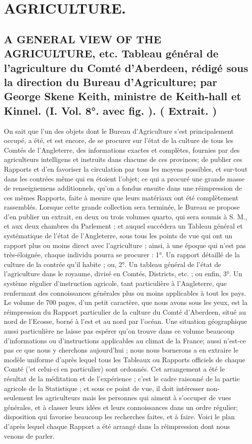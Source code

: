 \setcounter{page}{337}
\chapter{AGRICULTURE.}
\section{A GENERAL VIEW OF THE AGRICULTURE, etc. Tableau général de l'agriculture du Comté d'Aberdeen, rédigé sous la direction du Bureau d'Agriculture; par George Skene Keith, ministre de Keith-hall et Kinnel. (I. Vol. 8°. avec fig. ). \large{( Extrait. )}}
On sait que l'un des objets dont le Bureau d'Agriculture s'est principalement occupé, a été, et est encore, de se procurer sur l'état de la culture de tous les Comtés de l'Angleterre, des informations exactes et complètes, fournies par des agriculteurs intelligens et instruits dans chacune de ces provinces; de publier ces Rapports et d'en favoriser la circulation par tous les moyens possibles, et sur-tout dans les contrées même qui en étoient l'objet; ce qui a procuré une grande masse de renseignemens additionnels, qu'on a fondus ensuite dans une réimpression de ces mêmes Rapports, faite à mesure que leurs matériaux ont été complètement rassemblés.\setcounter{page}{338} Lorsque cette grande collection sera terminée, le Bureau se propose d'en publier un extrait, en deux ou trois volumes quarto, qui sera soumis à S. M., et aux deux chambres du Parlement ; et auquel succédera un Tableau général et systématique de l'état de l'Angleterre, sous tous les points de vue qui ont un rapport plus ou moins direct avec l'agriculture ; ainsi, à une époque qui n'est pas très-éloignée, chaque individu pourra se procurer :
1°. Un rapport détaillé de la culture de la contrée qu'il habite ; ou,
2°. Un tableau général de l'état de l'agriculture dans le royaume, divisé en Comtés, Districts, etc. ; ou enfin,
3°. Un système régulier d'instruction agricole, tant particulière à l'Angleterre, que renfermant des connoissances générales plus ou moins applicables à tout les pays.
Le volume de 700 pages, d'un petit caractère, que nous avons sous les yeux, est la réimpression du Rapport particulier de la culture du Comté d'Aberdeen, situé au nord de l'Ecosse, borné à l'est et au nord par l'océan. Une situation géographique aussi particulière ne laisse pas espérer qu'on trouve dans ce volume beaucoup d'informations ou d'instructions applicables au climat de la\setcounter{page}{339} France; aussi n'est-ce pas ce que nous y cherchons aujourd'hui ; nous nous bornerons a en extraire le modèle uniforme d'après lequel tous les Tableaux ou Rapports officiels de chaque Comté ('et celui-ci en particulier) sont ordonnés. Cet arrangement a été le résultat de la méditation et de l'expérience ; c'est le cadre raisonné de la partie agricole de la Statistique ; et sous ce point de vue, il doit intéresser non-seulement les agriculteurs mais les personnes qui aiment à s'occuper de vues générales, et à classer leurs idées et leurs connoissances dans un ordre régulier; disposition qui favorise beaucoup les recherches faites, et à faire. Voici le plan d'après lequel chaque Rapport a été arrangé dans la réimpression dont nous venons de parler.
